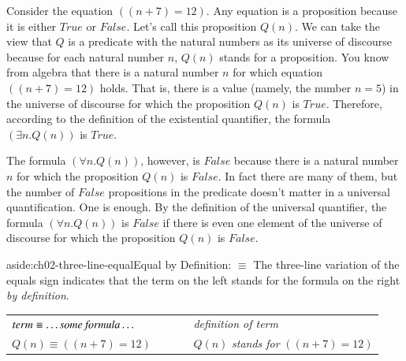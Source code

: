 {{Consider the equation $((n + 7) = 12)$.
Any equation is a proposition because it is either
$True$ or $False$. Let's call this proposition $Q(n)$.
We can take the view that $Q$ is a predicate
with the natural numbers as its universe of discourse
because for each natural number $n$,
$Q(n)$ stands for a proposition.
You know from algebra that there is a natural number
$n$ for which equation $((n + 7) = 12)$ holds.
That is, there is a value (namely, the number $n=5$) in the universe
of discourse for which the proposition $Q(n)$ is $True$.
Therefore, according to the definition of the
existential quantifier,
the formula $(\exists n.Q(n))$ is $True$.

The formula $(\forall n.Q(n))$, however, is $False$
because there is a natural number $n$ for which
the proposition $Q(n)$ is $False$.
In fact there are many of them, but
the number of $False$ propositions in the predicate doesn't matter
in a universal quantification. One is enough.
By the definition of the universal quantifier,
the formula $(\forall n.Q(n))$
is $False$ if there is even one element of the
universe of discourse for which the proposition
$Q(n)$ is $False$.

\begin{aside}{aside:ch02-three-line-equal}{Equal by Definition: $\equiv$}
The three-line variation of the equals sign
indicates that the term on the left stands
for the formula on the right \emph{by definition}.
\begin{center}
\begin{tabular}{ll}
$term \equiv \dots \emph{some formula} \dots$ & ~~~~~ \emph{definition of term} \\
$Q(n) \equiv ((n + 7) = 12)$                  & ~~~~~ $Q(n)$ \emph{stands for} $((n + 7) = 12)$ \\
\end{tabular}
\end{center}
\end{aside}

}}
